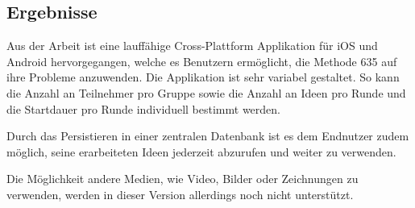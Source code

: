\subsection{Ergebnisse}
Aus der Arbeit ist eine lauffähige Cross-Plattform Applikation für iOS und Android hervorgegangen, welche es Benutzern ermöglicht, die Methode 635 auf ihre Probleme anzuwenden. Die Applikation ist sehr variabel gestaltet. So kann die Anzahl an Teilnehmer pro Gruppe sowie die Anzahl an Ideen pro Runde und die Startdauer pro Runde individuell bestimmt werden. 

Durch das Persistieren in einer zentralen Datenbank ist es dem Endnutzer zudem möglich, seine erarbeiteten Ideen jederzeit abzurufen und weiter zu verwenden. 

Die Möglichkeit andere Medien, wie Video, Bilder oder Zeichnungen zu verwenden, werden in dieser Version allerdings noch nicht unterstützt.
